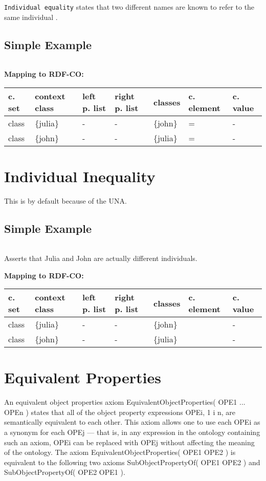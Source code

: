 \documentclass{llncs}
\newcommand{\ms}[1]{\texttt{#1}}
\newenvironment{gcotable}{
  \scriptsize
  \sffamily
  \vspace{0cm}
	\begin{center}
	\textbf{\vspace{0.4cm}Mapping to RDF-CO:} \\
  \begin{tabular}{l|l|l|l|l|l|l}
	\hline
  \textbf{c. set} & \textbf{context class} & \textbf{left p. list} & \textbf{right p. list} & \textbf{classes} & \textbf{c. element} & \textbf{c. value} \\
  \hline

}{
  \hline
  \end{tabular}
	\end{center}
}
\newenvironment{DL}{
\vspace{0cm}
	\begin{center}
  \begin{tabular}{r l}

}{
  \end{tabular}
	\end{center}
}
\begin{document}
\ms{Individual equality} states that two different names are known to refer to the same individual \cite{Kroetzsch2012}.

\subsection{Simple Example}

\begin{DL}
\\
\end{DL}

\begin{gcotable}
class & \{julia\} & - & - & \{john\} & = & - \\
class & \{john\} & - & - & \{julia\} & = & - \\
\end{gcotable}

\section{Individual Inequality}

This is by default because of the UNA.

\subsection{Simple Example}

\begin{DL}
\\
\end{DL}

Asserts that Julia and John are actually different individuals.

\begin{gcotable}
class & \{julia\} & - & - & \{john\} &  & - \\
class & \{john\} & - & - & \{julia\} &  & - \\
\end{gcotable}

\section{Equivalent Properties}
An equivalent object properties axiom EquivalentObjectProperties( OPE1 ... OPEn ) states that all of the object property expressions OPEi, 1  i  n, are semantically equivalent to each other. This axiom allows one to use each OPEi as a synonym for each OPEj — that is, in any expression in the ontology containing such an axiom, OPEi can be replaced with OPEj without affecting the meaning of the ontology. The axiom EquivalentObjectProperties( OPE1 OPE2 ) is equivalent to the following two axioms SubObjectPropertyOf( OPE1 OPE2 ) and SubObjectPropertyOf( OPE2 OPE1 ).
\end{document}
